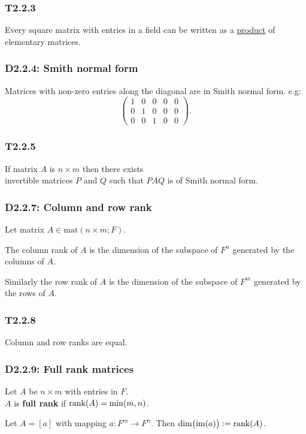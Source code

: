 \documentclass{article}
\newcommand{\deq}{\vcentcolon=}
\begin{document}
\begin{multicols*}{3}
\subsubsection*{T2.2.3}
Every square matrix with entries in a field can be written
as a \underline{product} of elementary matrices.

\subsubsection*{D2.2.4: Smith normal form}
Matrices with non-zero entries along the diagonal are
in Smith normal form. e.g:
$$\begin{pmatrix}
    1 & 0 & 0 & 0 & 0 \\
    0 & 1 & 0 & 0 & 0 \\
    0 & 0 & 1 & 0 & 0
\end{pmatrix}.$$

\subsubsection*{T2.2.5}
If matrix $A$ is $n\times m$
then there exists \\ invertible matrices $P$ and $Q$ 
such that $PAQ$ is of Smith normal form.

\subsubsection*{D2.2.7: Column and row rank}
Let matrix $A\in\text{mat}(n\times m;F)$.

The column rank of $A$ is the dimension of the subspace
of $F^n$ generated by the columns of $A$.

Similarly the row rank of $A$ is the dimension of the subspace
of $F^m$ generated by the rows of $A$.

\subsubsection*{T2.2.8}
Column and row ranks are equal.

\subsubsection*{D2.2.9: Full rank matrices}
Let $A$ be $n\times m$ with entries in $F$. \\
$A$ is \textbf{full rank} if $\rank(A)=\min(m,n)$.

Let $A=[a]$ with mapping $a:F^m\rightarrow F^n$.
Then $\dim\bigl(\text{im}(a)\bigr)\deq\rank(A)$.


\end{multicols*}
\end{document}
